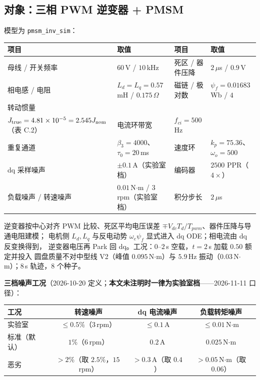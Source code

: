 \documentclass[11pt,a4paper]{article}
\theoremstyle{remark}\newtheorem{remark}{注}
\begin{document}
\subsection{对象：三相 PWM 逆变器 + PMSM}
模型为 \texttt{pmsm\_inv\_sim}：
\begin{center}\footnotesize
\begin{tabular}{@{}llll@{}}
\toprule
项目 & 取值 & 项目 & 取值\\
\midrule
母线 / 开关频率 & $60$\,V / $10$\,kHz & 死区 / 器件压降 & $2\,\mu$s / $0.9$\,V\\
相电感 / 电阻 & $L_d=L_q=0.57$\,mH / $0.175\,\Omega$ & 磁链 / 极对数 & $\psi_f=0.01683$\,Wb / $4$\\
转动惯量 & \shortstack[l]{$J_{\rm nom}=1.89\times10^{-5}$（$b_0$ 标定）\\ $J_{\rm true}=4.81\times10^{-5}=2.545J_{\rm nom}$（表 C.2）} & 电流环带宽 & $f_{ci}=500$\,Hz\\
重复通道 & $\beta_3=4000$、$\tau_0=20$\,ms & 速度环 & $k_p=75.36$、$\omega_o=500$\\
dq 采样噪声 & $\pm0.1$\,A（实验室档） & 编码器 & $2500$ PPR（$4\times$）\\
负载噪声 / 转速噪声 & $0.01$\,N$\cdot$m / $3$\,rpm（实验室档） & 积分步长 & $2\,\mu$s\\
\bottomrule
\end{tabular}
\end{center}
逆变器按中心对齐 PWM 比较、死区平均电压误差 $\mp V_{dc}T_d/T_{pwm}$、器件压降与导通电阻建模；
电机侧 $L_d,L_q$ 与反电动势 $\omega_e\psi_f$ 显式进入 dq ODE；相电流由 dq 反变换得到，
逆变器电压再 Park 回 dq。工况：$0$--$2$\,s 空载，$t=2$\,s 加载 $0.50$ 额定并投入
圆盘质量不对中型线 V2（峰值 $0.095$\,N$\cdot$m）与 $5.9$\,Hz 振动（$0.03$\,N$\cdot$m）；$8$\,s 轨迹，$8$ 个种子。

\noindent\textbf{三档噪声工况}（2026-10-20 定义；\textbf{本文未注明时一律为实验室档}——2026-11-11 口径）：
\begin{center}\footnotesize
\begin{tabular}{@{}lccc@{}}
\toprule
工况 & 转速噪声 & dq 电流噪声 & 负载转矩噪声\\
\midrule
实验室 & $\le0.5\%$（$3$\,rpm） & $\le0.1$\,A & $\le0.01$\,N$\cdot$m\\
标准（默认） & $1\%$（$6$\,rpm） & $0.2$\,A & $0.025$\,N$\cdot$m\\
恶劣 & $>2\%$（取 $2.5\%$，$15$\,rpm） & $>0.3$\,A（取 $0.4$） & $>0.05$\,N$\cdot$m（取 $0.06$）\\
\bottomrule
\end{tabular}
\end{center}
\end{document}
